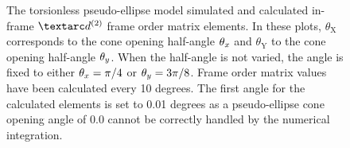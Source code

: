 \begin{figure}
\begin{tabular}{@{}cc@{}}
  \end{tabular}
  \caption[Torsionless pseudo-ellipse simulated and calculated in-frame Daeg$^{(2)}$ elements.]{
    The torsionless pseudo-ellipse model simulated and calculated in-frame $\FOtwo$ frame order matrix elements.
    In these plots, $\theta_\textrm{X}$ corresponds to the cone opening half-angle $\theta_x$ and $\theta_\textrm{Y}$ to the cone opening half-angle $\theta_y$.
    When the half-angle is not varied, the angle is fixed to either $\theta_x = \pi/4$ or $\theta_y = 3\pi/8$.
    Frame order matrix values have been calculated every 10 degrees.
    The first angle for the calculated elements is set to 0.01 degrees as a pseudo-ellipse cone opening angle of 0.0 cannot be correctly handled by the numerical integration.
  }
  \label{fig: simulated and calculated in-frame 2nd degree pseudo-ellipse, torsionless frame order}
\end{figure}

